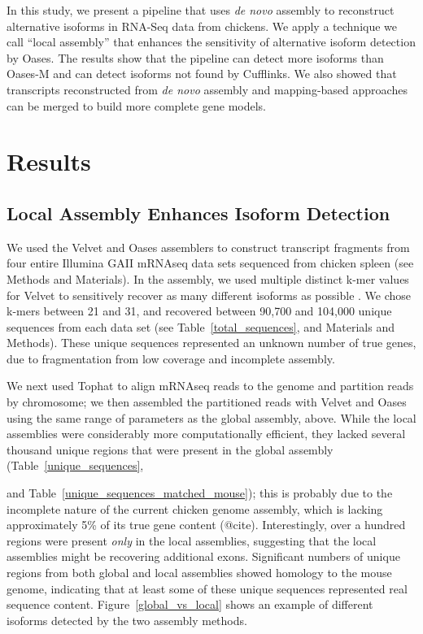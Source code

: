 \documentclass[10pt]{article}
\begin{document}
In this study, we present a pipeline that uses {\em de novo} assembly
to reconstruct alternative isoforms in RNA-Seq data from chickens.  We
apply a technique we call ``local assembly'' that enhances the sensitivity
of alternative isoform detection by Oases.  The results show that the
pipeline can detect more isoforms than Oases-M and can detect isoforms
not found by Cufflinks.  We also showed that transcripts reconstructed
from {\em de novo} assembly and mapping-based approaches can be merged
to build more complete gene models.

\section*{Results}

\subsection*{Local Assembly Enhances Isoform Detection}

We used the Velvet\cite{Zerbino:2008vu} and Oases\cite{Schulz:2012je}
assemblers to construct transcript fragments from four entire Illumina
GAII mRNAseq data sets sequenced from chicken spleen (see Methods and
Materials).  In the assembly, we used multiple distinct k-mer values
for Velvet to sensitively recover as many different isoforms as possible
\cite{Schulz:2012je}.  We chose k-mers between 21 and 31,
and recovered between 90,700 and 104,000 unique sequences from
each data set (see Table~\ref{total_sequences}, and Materials and
Methods).  These unique sequences represented an unknown number of
true genes, due to fragmentation from low coverage and incomplete
assembly.

We next used Tophat to align mRNAseq reads to the genome and partition
reads by chromosome; we then assembled the partitioned reads with
Velvet and Oases using the same range of parameters as the global
assembly, above.  While the local assemblies were considerably more
computationally efficient, they lacked several thousand unique regions
that were present in the global assembly (Table~\ref{unique_sequences},


and Table~\ref{unique_sequences_matched_mouse}); this is probably due to the
incomplete nature of the current chicken genome assembly, which is lacking
approximately 5\% of its true gene content (@cite).  Interestingly, over a
hundred regions were present {\em only} in the local assemblies,
suggesting that the local assemblies might be recovering additional exons.
Significant numbers of unique regions from both global and local assemblies
showed homology to the mouse genome, indicating that at least some of these
unique sequences represented real sequence content.
Figure~\ref{global_vs_local} shows an example of different isoforms detected by
the two assembly methods.
\end{document}
